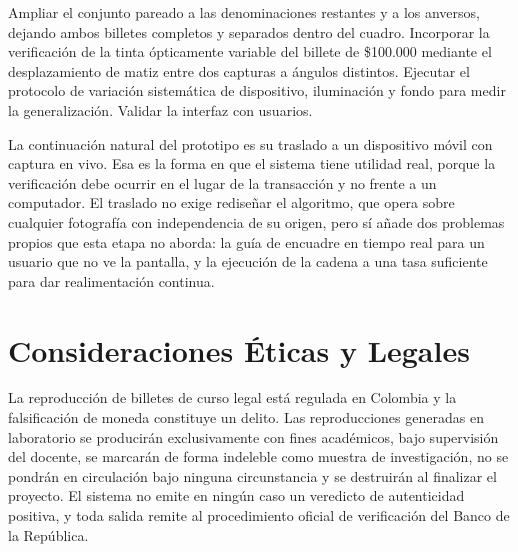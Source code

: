 \documentclass[conference]{IEEEtran}
\begin{document}
Ampliar el conjunto pareado a las denominaciones restantes y a los
anversos, dejando ambos billetes completos y separados dentro del
cuadro. Incorporar la verificación de la tinta ópticamente variable del
billete de \$100.000 mediante el desplazamiento de matiz entre dos
capturas a ángulos distintos. Ejecutar el protocolo de variación
sistemática de dispositivo, iluminación y fondo para medir la
generalización. Validar la interfaz con usuarios.

La continuación natural del prototipo es su traslado a un dispositivo
móvil con captura en vivo. Esa es la forma en que el sistema tiene
utilidad real, porque la verificación debe ocurrir en el lugar de la
transacción y no frente a un computador. El traslado no exige
rediseñar el algoritmo, que opera sobre cualquier fotografía con
independencia de su origen, pero sí añade dos problemas propios que
esta etapa no aborda: la guía de encuadre en tiempo real para un
usuario que no ve la pantalla, y la ejecución de la cadena a una tasa
suficiente para dar realimentación continua.

\section{Consideraciones Éticas y Legales}

La reproducción de billetes de curso legal está regulada en Colombia y
la falsificación de moneda constituye un delito. Las reproducciones
generadas en laboratorio se producirán exclusivamente con fines
académicos, bajo supervisión del docente, se marcarán de forma indeleble
como muestra de investigación, no se pondrán en circulación bajo ninguna
circunstancia y se destruirán al finalizar el proyecto. El sistema no
emite en ningún caso un veredicto de autenticidad positiva, y toda
salida remite al procedimiento oficial de verificación del Banco de la
República.
\end{document}
